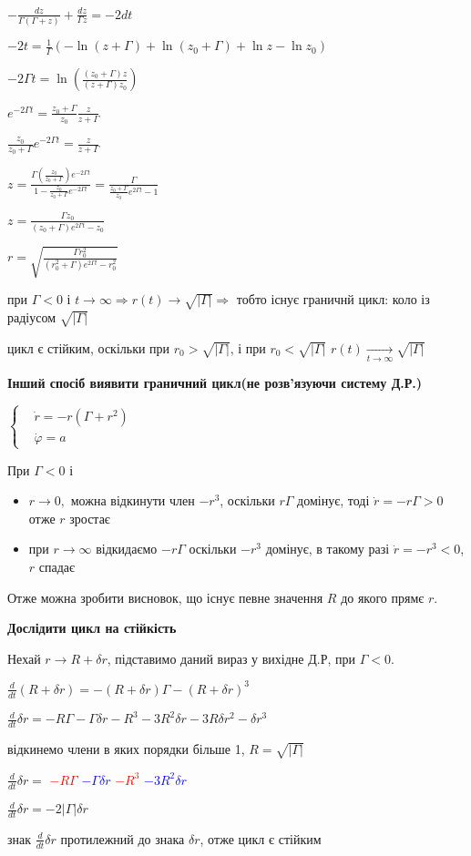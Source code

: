 $-\frac{dz}{\Gamma(\Gamma + z)} + \frac{dz}{\Gamma z} = -2dt$

$-2t = \frac{1}{\Gamma}(-\ln(z+\Gamma) + \ln(z_0+\Gamma) + \ln z - \ln z_0)$

$-2\Gamma t = \ln(\frac{(z_0 + \Gamma)z}{(z+\Gamma)z_0})$

$e^{-2\Gamma t} = \frac{z_0 + \Gamma}{z_0} \frac{z}{z+\Gamma}$

$\frac{z_0}{z_0+\Gamma} e^{-2\Gamma t} = \frac{z}{z+\Gamma}$

$z = \frac{\Gamma(\frac{z_0}{z_0+\Gamma})e^{-2\Gamma t}}{1-\frac{z_0}{z_0+\Gamma}e^{-2\Gamma t}} = 
\frac{\Gamma}{\frac{z_0+\Gamma}{z_0}e^{2\Gamma t} - 1}$

$z = \frac{\Gamma z_0}{(z_0+\Gamma)e^{2\Gamma t} - z_0}$

$r = \sqrt{\frac{\Gamma r^2_0}{(r^2_0+\Gamma)e^{2\Gamma t} - r^2_0}}$

при $ \Gamma < 0$ і $t \rightarrow \infty \Longrightarrow r(t)\rightarrow \sqrt{|\Gamma|}
\Longrightarrow$ тобто існує граничнй цикл: коло із радіусом $\sqrt{|\Gamma|}$ 

цикл є стійким, оскільки при $r_0 > \sqrt{|\Gamma|}$, і при $r_0 < \sqrt{|\Gamma|}$
$r(t) \underset{t \to \infty}{\longrightarrow} \sqrt{|\Gamma|}$

\textbf{Інший спосіб виявити граничний цикл(не розв'язуючи систему Д.Р.)}

$\left\{\begin{aligned}
    &\dot{r} = -r(\Gamma + r^2)\\
    &\dot{\varphi} = a
\end{aligned}\right.$

При $\Gamma < 0$ і \\[-15mm]
\begin{itemize}
    \item {
        $r \to 0,$ можна відкинути член $-r^3$, оскільки $r\Gamma$ домінує, тоді 
        $\dot{r} = -r\Gamma > 0$ отже $r$ зростає
    }
    \item {
        при $r \to \infty$ відкидаємо $-r\Gamma$ оскільки $-r^3$ домінує, в такому разі
        $\dot{r}=-r^3 < 0$, $r$ спадає
    }
\end{itemize} 

Отже можна зробити висновок, що існує певне значення $R$ до якого прямє $r$.

\textbf{Дослідити цикл на стійкість}

Нехай $r \to R + \delta r$,  підставимо даний вираз у вихідне Д.Р, при $\Gamma < 0$.

$\frac{d}{dt}(R+\delta r) = -(R+\delta r)\Gamma - (R+\delta r)^3$

$\frac{d}{dt}\delta r = -R\Gamma -\Gamma\delta r - R^3 - 3R^2 \delta r - 
3R\delta r^2 - \delta r^3$

відкинемо члени в яких порядки більше 1, $R = \sqrt{|\Gamma|}$

$\frac{d}{dt}\delta r =$ \textcolor{red}{$-R\Gamma$} \textcolor{blue}{$-\Gamma\delta r$} 
\textcolor{red}{$-R^3$} \textcolor{blue}{$-3R^2\delta r$} 

$\frac{d}{dt}\delta r = -2|\Gamma|\delta r$

знак $\frac{d}{dt}\delta r$ протилежний до знака $\delta r$, отже цикл є стійким